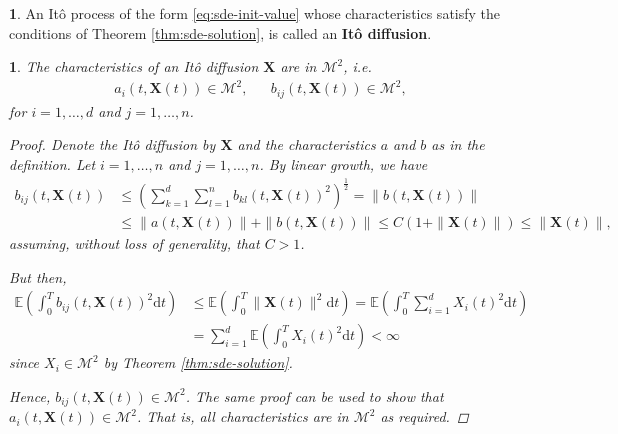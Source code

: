 \documentclass[english]{article}
\newcommand{\comment}[1]{\color{blue}#1\color{black}}
\numberwithin{equation}{section}
\numberwithin{figure}{section}
\theoremstyle{bolddescit}
\theoremstyle{definition}
\newtheorem{definition}[theorem]{\protect\definitionname}
\theoremstyle{definition}
\theoremstyle{plain}
\newtheorem{lemma}[theorem]{\protect\lemmaname}
\theoremstyle{plain}
\theoremstyle{bolddesc}
\theoremstyle{plain}
\theoremstyle{remark}
\providecommand{\definitionname}{Definition}
\providecommand{\lemmaname}{Lemma}
\begin{document}
\begin{definition}
  An It\^o process of the form \eqref{eq:sde-init-value} whose characteristics satisfy the conditions of Theorem \ref{thm:sde-solution}, is called an \textbf{It\^o diffusion}.
\end{definition}

\begin{lemma}\label{lem:ito-diffusion-characteristics-m2}
  The characteristics of an It\^o diffusion $\mathbf{X}$ are in $\mathcal{M}^2$, i.e.
  \begin{align*}
    a_i(t,\mathbf{X}(t)) \in \mathcal{M}^2, &&
    b_{ij}(t,\mathbf{X}(t)) \in \mathcal{M}^2,
  \end{align*}
  for $i=1,\ldots,d$ and $j=1,\ldots,n$.

  \begin{proof}
    Denote the It\^o diffusion by $\mathbf{X}$ and the characteristics $a$ and $b$ as in the definition. Let $i=1,\ldots,n$ and $j=1,\ldots,n$. By linear growth, we have
    \begin{align*}
      b_{ij}(t,\mathbf{X}(t))
      &\le \left( \sum_{k=1}^d \sum_{l=1}^n b_{kl}(t,\mathbf{X}(t))^2 \right)^{\frac{1}{2}}
      = \|b(t,\mathbf{X}(t))\|\\
      &\le \|a(t,\mathbf{X}(t))\| + \|b(t,\mathbf{X}(t))\|
      \le C (1 + \|\mathbf{X}(t)\|)
      \le \|\mathbf{X}(t)\|,
    \end{align*}
    assuming, without loss of generality, that $C > 1$.

    But then,
    \begin{align*}
      \mathbb{E} \left( \int_0^T b_{ij}(t,\mathbf{X}(t))^2 \mathrm{d}t \right)
      &\le \mathbb{E} \left( \int_0^T \|\mathbf{X}(t)\|^2 \mathrm{d}t \right)
      = \mathbb{E} \left( \int_0^T \sum_{i=1}^d X_i(t)^2 \mathrm{d}t \right)\\
      &= \sum_{i=1}^d \mathbb{E} \left( \int_0^T X_i(t)^2 \mathrm{d}t \right) < \infty \tag{linearity}
    \end{align*}
    since $X_i \in \mathcal{M}^2$ by Theorem \ref{thm:sde-solution}.

    Hence, $b_{ij}(t,\mathbf{X}(t)) \in \mathcal{M}^2$. The same proof can be used to show that $a_i(t,\mathbf{X}(t)) \in \mathcal{M}^2$. That is, all characteristics are in $\mathcal{M}^2$ as required.
  \end{proof}
\end{lemma}
\end{document}
